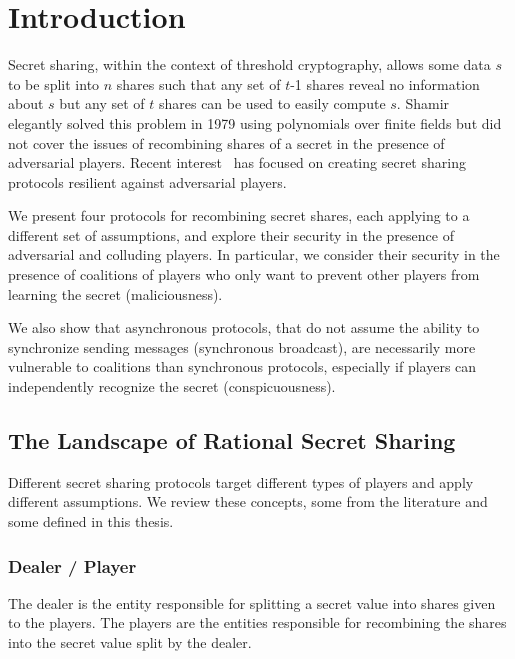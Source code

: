 \documentclass[12pt]{dalcsthesis}
\begin{document}
\mainmatter

\chapter{Introduction}

Secret sharing, within the context of threshold cryptography, allows some data $s$ to be split into $n$ shares such that any set of $t$-1 shares reveal no information about $s$ but any set of $t$ shares can be used to easily compute $s$. Shamir~\cite{shamir79} elegantly solved this problem in 1979 using polynomials over finite fields but did not cover the issues of recombining shares of a secret in the presence of adversarial players. Recent interest~\cite{abraham06, fuch10, gordon06, kol08, maleka08, ong09} has focused on creating secret sharing protocols resilient against adversarial players.

We present four protocols for recombining secret shares, each applying to a different set of assumptions, and explore their security in the presence of adversarial and colluding players. In particular, we consider their security in the presence of coalitions of players who only want to prevent other players from learning the secret (maliciousness).

We also show that asynchronous protocols, that do not assume the ability to synchronize sending messages (synchronous broadcast), are necessarily more vulnerable to coalitions than synchronous protocols, especially if players can independently recognize the secret (conspicuousness).



\section{The Landscape of Rational Secret Sharing}

Different secret sharing protocols target different types of players and apply different assumptions. We review these concepts, some from the literature and some defined in this thesis.

\subsection{Dealer / Player}

The dealer is the entity responsible for splitting a secret value into shares given to the players. The players are the entities responsible for recombining the shares into the secret value split by the dealer.
\end{document}
